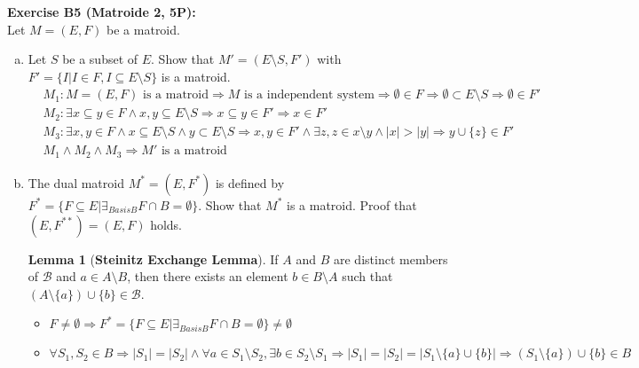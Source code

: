 \documentclass[12pt]{article}
\theoremstyle{definition}
\newtheorem{lemma}[theorem]{Lemma}
\begin{document}
\begin{flushleft}
\begin{itemize}
\end{itemize}
\textbf{Exercise B5 (Matroide 2, 5P):} \\
Let $M = (E, F)$ be a matroid.
\begin{enumerate}[(a)]
    \item Let $S$ be a subset of $E$. Show that $M' = (E \setminus S, F')$ with 
    $F' = \{I | I \in F, I \subseteq E \setminus S\}$ is a matroid.
    \newline
    \begin{align*}
        &M_1 : M = (E, F) \text{ is a matroid} \Longrightarrow M \text{ is a independent system} \Longrightarrow \emptyset \in F \Longrightarrow \emptyset \subset E \setminus S \Longrightarrow \emptyset \in F' \\
        &M_2 : \exists x \subseteq y \in F \land x, y \subseteq E \setminus S \Longrightarrow x \subseteq y \in F' \Longrightarrow x \in F' \\
        &M_3 : \exists x, y \in F \land x \subseteq E \setminus S \land y \subset E \setminus S \Longrightarrow x, y \in F' \land \exists z, z \in x \setminus y \land |x| > |y| \Longrightarrow y \cup \{z\} \in F' \\
        &M_1 \land M_2 \land M_3 \Longrightarrow M' \text{ is a matroid}
    \end{align*}
    \item The dual matroid $M^* = (E, F^*)$ is defined by $F^* = \{F \subseteq E | \exists_{Basis B} F \cap B = \emptyset\}$.
    Show that $M^*$ is a matroid. Proof that $(E, F^{**}) = (E, F)$ holds.
    \newline
    \begin{lemma}[\textbf{Steinitz Exchange Lemma}]%
        If ${\displaystyle A}$ and ${\displaystyle B}$ are distinct members of ${\displaystyle {\mathcal {B}}}$ and 
        ${\displaystyle a\in A\setminus B}$, then there exists an element ${\displaystyle b\in B\setminus A}$ 
        such that ${\displaystyle (A\setminus \{a\})\cup \{b\}\in {\mathcal {B}}}$.
    \end{lemma}
    \begin{itemize}
        \item $F \not = \emptyset \Longrightarrow F^* = \{F \subseteq E | \exists_{Basis B} F \cap B = \emptyset \} \not = \emptyset$
        \item $\forall S_1, S_2 \in B \Longrightarrow |S_1| = |S_2| \land \forall a \in S_1 \setminus S_2, \exists b \in S_2 \setminus S_1 \Longrightarrow
            |S_1| = |S_2| = |S_1 \setminus \{a\} \cup \{b\} | \Longrightarrow (S_1 \setminus \{a\}) \cup \{b\} \in B$

\end{itemize}
\end{enumerate}
\end{flushleft}
\end{document}
